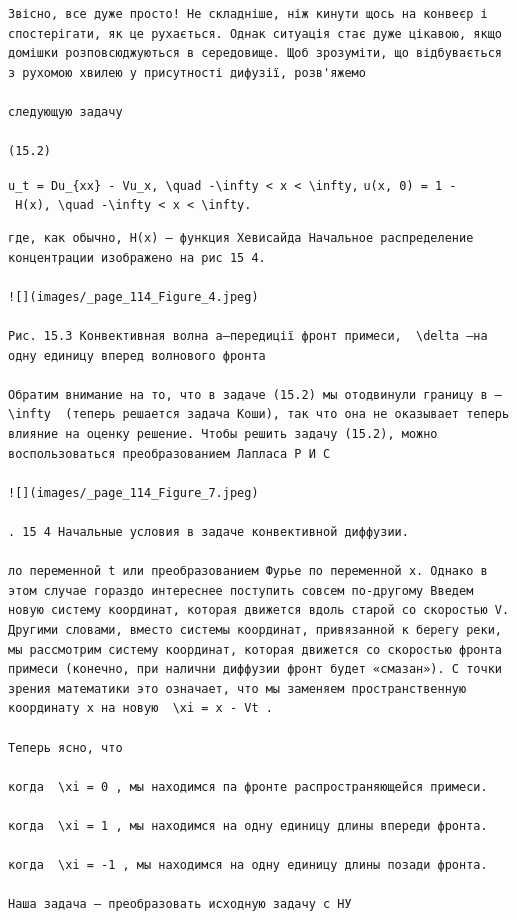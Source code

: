 \documentclass[
  ukrainian,
]{article}
\begin{document}
\begin{verbatim}
Звісно, все дуже просто! Не складніше, ніж кинути щось на конвеєр і спостерігати, як це рухається. Однак ситуація стає дуже цікавою, якщо домішки розповсюджуються в середовище. Щоб зрозуміти, що відбувається з рухомою хвилею у присутності дифузії, розв'яжемо

следующую задачу

(15.2)
\end{verbatim}

\texttt{u\_t\ =\ Du\_\{xx\}\ -\ Vu\_x,\ \textbackslash{}quad\ -\textbackslash{}infty\ \textless{}\ x\ \textless{}\ \textbackslash{}infty,}
\texttt{u(x,\ 0)\ =\ 1\ -\ H(x),\ \textbackslash{}quad\ -\textbackslash{}infty\ \textless{}\ x\ \textless{}\ \textbackslash{}infty.}

\begin{verbatim}
где, как обычно, H(x) — функция Хевисайда Начальное распределение концентрации изображено на рис 15 4.

![](images/_page_114_Figure_4.jpeg)

Рис. 15.3 Конвективная волна a—передиції фронт примеси,  \delta —на одну единицу вперед волнового фронта

Обратим внимание на то, что в задаче (15.2) мы отодвинули границу в —  \infty  (теперь решается задача Коши), так что она не оказывает теперь влияние на оценку решение. Чтобы решить задачу (15.2), можно воспользоваться преобразованием Лапласа Р И С

![](images/_page_114_Figure_7.jpeg)

. 15 4 Начальные условия в задаче конвективной диффузии.

ло переменной t или преобразованием Фурье по переменной x. Однако в этом случае гораздо интереснее поступить совсем по-другому Введем новую систему координат, которая движется вдоль старой со скоростью V. Другими словами, вместо системы координат, привязанной к берегу реки, мы рассмотрим систему координат, которая движется со скоростью фронта примеси (конечно, при налични диффузии фронт будет «смазан»). С точки зрения математики это означает, что мы заменяем пространственную координату x на новую  \xi = x - Vt .

Теперь ясно, что

когда  \xi = 0 , мы находимся па фронте распространяющейся примеси.

когда  \xi = 1 , мы находимся на одну единицу длины впереди фронта.

когда  \xi = -1 , мы находимся на одну единицу длины позади фронта.

Наша задача — преобразовать исходную задачу с НУ
\end{verbatim}
\end{document}
